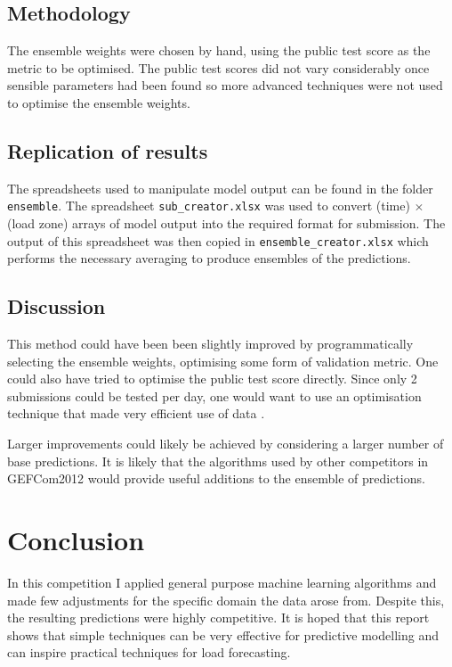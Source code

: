 \documentclass[preprint,authoryear,12pt]{elsarticle}
\begin{document}
\subsection{Methodology}

The ensemble weights were chosen by hand, using the public test score as the metric to be optimised.
The public test scores did not vary considerably once sensible parameters had been found so more advanced techniques were not used to optimise the ensemble weights.

\subsection{Replication of results}

The spreadsheets used to manipulate model output can be found in the folder \texttt{ensemble}.
The spreadsheet \texttt{sub\_creator.xlsx} was used to convert (time) $\times$ (load zone) arrays of model output into the required format for submission.
The output of this spreadsheet was then copied in \texttt{ensemble\_creator.xlsx} which performs the necessary averaging to produce ensembles of the predictions.

\subsection{Discussion}

This method could have been been slightly improved by programmatically selecting the ensemble weights, optimising some form of validation metric.
One could also have tried to optimise the public test score directly.
Since only 2 submissions could be tested per day, one would want to use an optimisation technique that made very efficient use of data \citep[e.g.][]{Osborne2009}.

Larger improvements could likely be achieved by considering a larger number of base predictions.
It is likely that the algorithms used by other competitors in GEFCom2012 would provide useful additions to the ensemble of predictions.

\section{Conclusion}

In this competition I applied general purpose machine learning algorithms and made few adjustments for the specific domain the data arose from.
Despite this, the resulting predictions were highly competitive.
It is hoped that this report shows that simple techniques can be very effective for predictive modelling and can inspire practical techniques for load forecasting.
\end{document}
